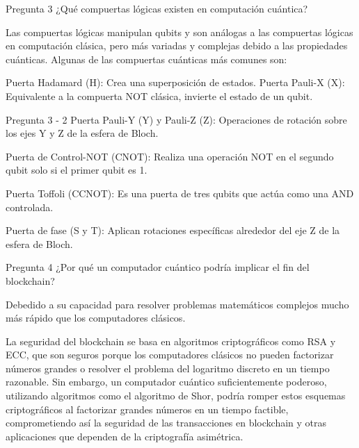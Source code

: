 \documentclass[presentation]{beamer}
\begin{document}
\begin{frame}[label={sec:orga025cb7}]{Pregunta 3}
¿Qué compuertas lógicas existen en computación cuántica?

Las compuertas lógicas manipulan qubits y son análogas a las compuertas lógicas en computación clásica, pero más variadas y complejas debido a las propiedades cuánticas. Algunas de las compuertas cuánticas más comunes son:

Puerta Hadamard (H): Crea una superposición de estados.
Puerta Pauli-X (X): Equivalente a la compuerta NOT clásica, invierte el estado de un qubit.
\end{frame}

\begin{frame}[label={sec:org1d2b8df}]{Pregunta 3 - 2}
Puerta Pauli-Y (Y) y Pauli-Z (Z): Operaciones de rotación sobre los ejes Y y Z de la esfera de Bloch.\n

Puerta de Control-NOT (CNOT): Realiza una operación NOT en el segundo qubit solo si el primer qubit es 1.

Puerta Toffoli (CCNOT): Es una puerta de tres qubits que actúa como una AND controlada.

Puerta de fase (S y T): Aplican rotaciones específicas alrededor del eje Z de la esfera de Bloch.
\end{frame}

\begin{frame}[label={sec:org153f35e}]{Pregunta 4}
¿Por qué un computador cuántico podría implicar el fin del blockchain?

Debedido a su capacidad para resolver problemas matemáticos complejos mucho más rápido que los computadores clásicos.

La seguridad del blockchain se basa en algoritmos criptográficos como RSA y ECC, que son seguros porque los computadores clásicos no pueden factorizar números grandes o resolver el problema del logaritmo discreto en un tiempo razonable. Sin embargo, un computador cuántico suficientemente poderoso, utilizando algoritmos como el algoritmo de Shor, podría romper estos esquemas criptográficos al factorizar grandes números en un tiempo factible, comprometiendo así la seguridad de las transacciones en blockchain y otras aplicaciones que dependen de la criptografía asimétrica.
\end{frame}
\end{document}
